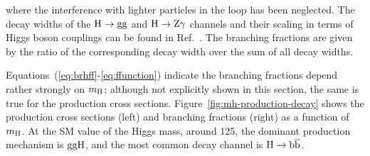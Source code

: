 % 
where the interference with lighter particles in the loop has been neglected.
% 
The decay widths of the $\mathrm{H}\to\mathrm{g}\mathrm{g}$ and $\mathrm{H}\to\mathrm{Z}\mathrm{\gamma}$ channels and their scaling in terms of Higgs boson couplings can be found in Ref.~\cite{higgshunter}.
% 
The branching fractions are given by the ratio of the corresponding decay width over the sum of all decay widths.


Equations~(\ref{eq:brhff}-\ref{eq:ffunction}) indicate the branching fractions depend rather strongly on $m_{\mathrm{H}}$; although not explicitly shown in this section, the same is true for the production cross sections.
% 
Figure~\ref{fig:mh-production-decay} shows the production cross sections (left) and branching fractions (right) as a function of $m_{\mathrm{H}}$.
% 
At the SM value of the Higgs mass, around 125\GeV, the dominant production mechanism is $\mathrm{g}\mathrm{g}\mathrm{H}$, and the most common decay channel is $\mathrm{H}\to\mathrm{b}\overline{\mathrm{b}}$.

